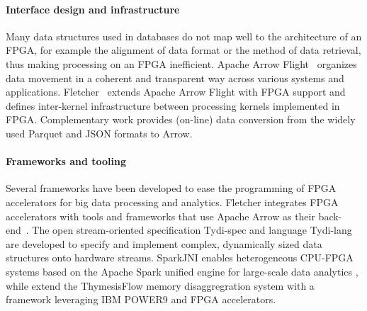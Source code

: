 \paragraph{Interface design and infrastructure} Many data structures used in databases do %
not map well to the architecture of an FPGA, for example the alignment of data format or the method of data retrieval, %
thus making processing on an FPGA inefficient. Apache Arrow Flight~\cite{ArrowFlight} organizes data movement in a coherent and transparent way across various systems and applications. Fletcher~ \cite{Peltenburg2021GeneratingArrow, Ahmad2022BenchmarkingMicroservices} extends Apache Arrow Flight with FPGA support %
and defines inter-kernel infrastructure between 
processing kernels implemented in FPGA. Complementary work provides (on-line) data conversion from the widely %
used Parquet \cite{Peltenburg2020BattlingFPGA} and JSON \cite{Peltenburg2021TensAccelerators} formats to Arrow. 

\paragraph{Frameworks and tooling} %
Several frameworks have been %
developed to ease the programming of FPGA accelerators for big data processing and analytics. %
Fletcher %
integrates FPGA accelerators with tools and frameworks that use Apache Arrow as their back-end~\cite{Peltenburg2019Fletcher:Arrow}.
The open stream-oriented specification Tydi-spec \cite{Peltenburg2020Tydi:Streams} and language Tydi-lang \cite{Tian2022TydilangAL} are developed to specify and implement complex, dynamically sized data structures onto hardware streams.
SparkJNI %
enables heterogeneous CPU-FPGA systems based on the Apache Spark unified engine for large-scale data analytics \cite{Voicu2019SparkJNI:Spark}, while 
\citet{Abrahamse2022Memory-DisaggregatedApplications} extend the ThymesisFlow \cite{9252003} memory disaggregration system with a framework leveraging IBM POWER9 and FPGA accelerators.


